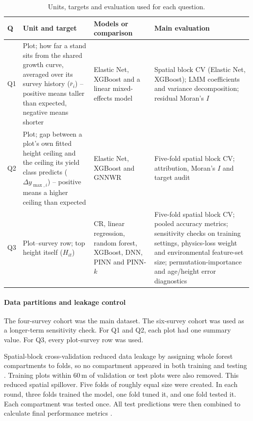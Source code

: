 \begin{table}[!ht]
\centering
\footnotesize
\renewcommand{\arraystretch}{1.2}
\begin{tabularx}{\linewidth}{@{} l >{\raggedright\arraybackslash}X >{\raggedright\arraybackslash}X >{\raggedright\arraybackslash}X @{}}
\toprule
Q & Unit and target & Models or comparison & Main evaluation \\
\midrule
Q1 & Plot; how far a stand sits from the shared growth curve, averaged over its survey history ($\bar r_i$) -- positive means taller than expected, negative means shorter & Elastic Net, XGBoost and a linear
mixed-effects model & Spatial block CV (Elastic Net, XGBoost); LMM coefficients and variance decomposition; residual Moran's $I$ \\
Q2 & Plot; gap between a plot's own fitted height ceiling and the ceiling its yield class predicts ($\Delta y_{\max,i}$) -- positive means a higher ceiling than expected & Elastic Net, XGBoost
and GNNWR & Five-fold spatial block CV; attribution, Moran's $I$ and target audit \\
Q3 & Plot--survey row; top height itself ($H_{it}$) & CR, linear regression, random forest, XGBoost, DNN, PINN and PINN-$k$
& Five-fold spatial block CV; pooled accuracy metrics; sensitivity checks on training
settings, physics-loss weight and environmental feature-set size; permutation-importance
and age/height error diagnostics \\
\bottomrule
\end{tabularx}
\caption{\small{Units, targets and evaluation used for each question.}}
\label{tab:rq-framework}
\end{table}

\paragraph*{Data partitions and leakage control}
The four-survey cohort was the main dataset. The six-survey cohort was used as a longer-term sensitivity check. For Q1 and Q2, each plot had one summary value. For Q3, every plot-survey row was used.

Spatial-block cross-validation reduced data leakage by assigning whole forest compartments to folds, so no compartment appeared in both training and testing \cite{roberts2017Cross_C5_EVAL}. Training plots within 60\,m of validation or test plots were also removed. This reduced spatial spillover. Five folds of roughly equal size were created. In each round, three folds trained the model, one fold tuned it, and one fold tested it. Each compartment was tested once. All test predictions were then combined to calculate final performance metrics \cite{ploton2020Spatial_C5_EVAL}.


